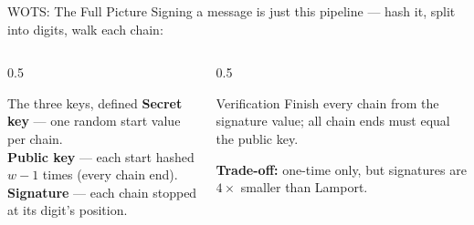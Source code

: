 \documentclass[aspectratio=169, 10pt]{beamer}
\begin{document}
\begin{frame}{WOTS: The Full Picture}
\vspace{2pt}
Signing a message is just this pipeline --- hash it, split into digits, walk each chain:

\vspace{8pt}
\centering
{}

\vspace{10pt}
\begin{columns}[t]
\begin{column}{0.5\textwidth}
\begin{block}{The three keys, defined}
\footnotesize
\textbf{Secret key} --- one random start value per chain.\\[2pt]
\textbf{Public key} --- each start hashed $w\!-\!1$ times (every chain end).\\[2pt]
\textbf{Signature} --- each chain stopped at its digit's position.
\end{block}
\end{column}
\begin{column}{0.5\textwidth}
\begin{block}{Verification}
\footnotesize
Finish every chain from the signature value; all chain ends must equal the public key.
\end{block}
\textbf{\footnotesize Trade-off:} one-time only, but signatures are $4\times$ smaller than Lamport.
\end{column}
\end{columns}
\end{frame}
\end{document}
